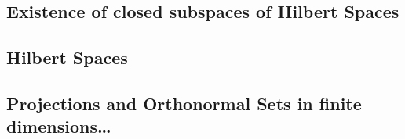 \subsection{Existence of closed subspaces of Hilbert Spaces}

\subsection{Hilbert Spaces}

\subsection{Projections and Orthonormal Sets in finite dimensions\ldots}
